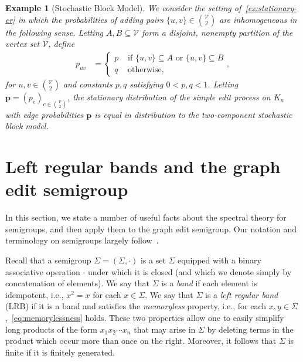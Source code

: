 \documentclass[11pt,a4paper]{article}
\newtheorem{example}[theorem]{Example}
\begin{document}
\begin{example}[Stochastic Block Model]\normalfont\label{ex:stationary-pb}
    We consider the setting of~\cref{ex:stationary-er} in which the probabilities of adding pairs $\{u, v\}\in{\mathcal{V}\choose 2}$ are inhomogeneous in the following sense. Letting $A, B\subseteq \mathcal{V}$ form a disjoint, nonempty partition of the vertex set $\mathcal{V}$, define
        \begin{align*}
            p_{uv} &= \begin{cases}
                p &\text{ if } \{u, v\}\subseteq A\text{ or }\{u, v\}\subseteq B\\
                q &\text{ otherwise,}
            \end{cases},
        \end{align*}
    for $u, v\in\binom{\mathcal{V}}{2}$ and constants $p, q$ satisfying $0<p, q<1$. Letting $\mathbf{p} = (p_{e})_{e\in{\mathcal{V}\choose 2}}$, the stationary distribution of the simple edit process on $K_n$ with edge probabilities $\mathbf{p}$ is equal in distribution to the two-component stochastic block model.
\end{example}

\section{Left regular bands and the graph edit semigroup}\label{sec:lrbs-edit-semigroup}

In this section, we state a number of useful facts about the spectral theory for semigroups, and then apply them to the graph edit semigroup. Our notation and terminology on semigroups largely follow~\cite{brownSemigroupsRingsMarkov2000}.

Recall that a semigroup $\Sigma = (\Sigma, \cdot)$ is a set $\Sigma$ equipped with a binary associative operation $\cdot$ under which it is closed (and which we denote simply by concatenation of elements). We say that $\Sigma$ is a \textit{band} if each element is idempotent, i.e., $x^2 = x$ for each $x\in \Sigma$. We say that $\Sigma$ is a \textit{left regular band} (LRB) if it is a band and satisfies the \textit{memoryless} property, i.e., for each $x,y\in \Sigma$,~\cref{eq:memorylessness} holds. These two properties allow one to easily simplify long products of the form $x_1x_2\cdots x_n$ that may arise in $\Sigma$ by deleting terms in the product which occur more than once on the right. Moreover, it follows that $\Sigma$ is finite if it is finitely generated.
\end{document}
